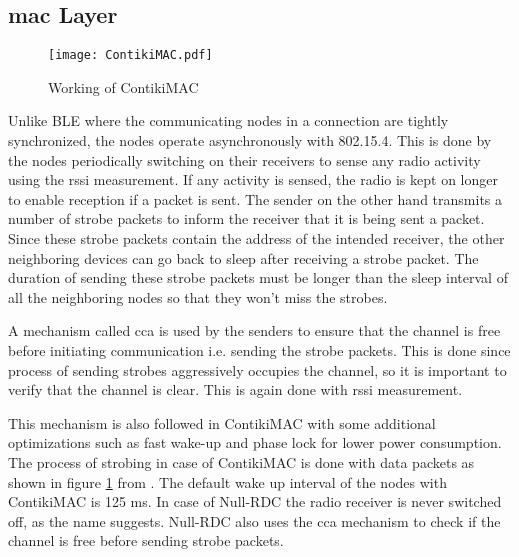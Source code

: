 \subsection{\texorpdfstring{\gls{mac}}{MAC} Layer}


\begin{figure}[h]
\centering

\texttt{[image: ContikiMAC.pdf]}
\caption{Working of ContikiMAC \cite{Dunkels2011}}
\label{fig:ContikiMAC}
\end{figure}


Unlike BLE where the communicating nodes in a connection are tightly synchronized, the nodes operate asynchronously with 802.15.4. This is done by the nodes periodically switching on their receivers to sense any radio activity using the \gls{rssi} measurement. If any activity is sensed, the radio is kept on longer to enable reception if a packet is sent. The sender on the other hand transmits a number of strobe packets to inform the receiver that it is being sent a packet. Since these strobe packets contain the address of the intended receiver, the other neighboring devices can go back to sleep after receiving a strobe packet. The duration of sending these strobe packets must be longer than the sleep interval of all the neighboring nodes so that they won't miss the strobes.


A mechanism called \gls{cca} is used by the senders to ensure that the channel is free before initiating communication i.e. sending the strobe packets. This is done since process of sending strobes aggressively occupies the channel, so it is important to verify that the channel is clear. This is again done with \gls{rssi} measurement.

This mechanism is also followed in ContikiMAC with some additional optimizations such as fast wake-up and phase lock for lower power consumption. The process of strobing in case of ContikiMAC is done with data packets as shown in figure \ref{fig:ContikiMAC} from \cite{Dunkels2011}. The default wake up interval of the nodes with ContikiMAC is 125 ms. In case of Null-RDC the radio receiver is never switched off, as the name suggests. Null-RDC also uses the \gls{cca} mechanism to check if the channel is free before sending strobe packets.
